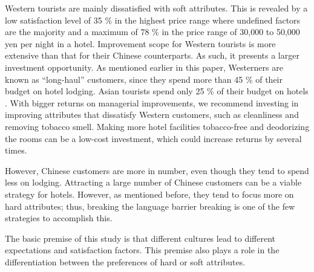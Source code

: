 \documentclass[smallextended,natbib]{svjour3}       %
\begin{document}
    Western tourists are mainly dissatisfied with soft attributes. This is revealed by a low satisfaction level of 35 \% in the highest price range where undefined factors are the majority and a maximum of 78 \% in the price range of 30,000 to 50,000 yen per night in a hotel. Improvement scope for Western tourists is more extensive than that for their Chinese counterparts. As such, it presents a larger investment opportunity. As mentioned earlier in this paper, Westerners are known as ``long-haul'' customers, since they spend more than 45 \% of their budget on hotel lodging.
    Asian tourists spend only 25 \% of their budget on hotels \cite[][]{choi2000}. With bigger returns on managerial improvements, we recommend investing in improving attributes that dissatisfy Western customers, such as cleanliness and removing tobacco smell. Making more hotel facilities tobacco-free and deodorizing the rooms can be a low-cost investment, which could increase returns by several times.

    However, Chinese customers are more in number, even though they tend to spend less on lodging. Attracting a large number of Chinese customers can be a viable strategy for hotels. However, as mentioned before, they tend to focus more on hard attributes; thus, breaking the language barrier breaking is one of the few strategies to accomplish this.

    The basic premise of this study is that different cultures lead to different expectations and satisfaction factors. This premise also plays a role in the differentiation between the preferences of hard or soft attributes.
\end{document}
